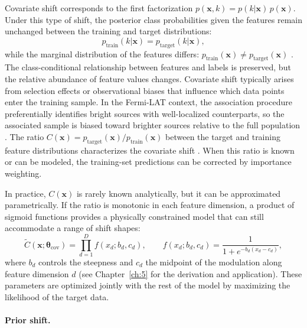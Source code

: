 Covariate shift corresponds to the first factorization $p(\mathbf{x}, k) = p(k|\mathbf{x})\,p(\mathbf{x})$.
Under this type of shift, the posterior class probabilities given the features remain unchanged between the training and target distributions:
\begin{equation}
	p_{\text{train}}(k|\mathbf{x}) = p_{\text{target}}(k|\mathbf{x}),
	\label{eq:covariate_shift}
\end{equation}
while the marginal distribution of the features differs: $p_{\text{train}}(\mathbf{x}) \neq p_{\text{target}}(\mathbf{x})$ \cite{MorenoTorres2012AUV}.
The class-conditional relationship between features and labels is preserved, but the relative abundance of feature values changes.
Covariate shift typically arises from selection effects or observational biases that influence which data points enter the training sample.
In the Fermi-LAT context, the association procedure preferentially identifies bright sources with well-localized counterparts, so the associated sample is biased toward brighter sources relative to the full population \cite{2023RASTI...2..735M}.
The ratio $C(\mathbf{x}) = p_{\text{target}}(\mathbf{x})/p_{\text{train}}(\mathbf{x})$ between the target and training feature distributions characterizes the covariate shift \cite{MorenoTorres2012AUV}.
When this ratio is known or can be modeled, the training-set predictions can be corrected by importance weighting.

In practice, $C(\mathbf{x})$ is rarely known analytically, but it can be approximated parametrically.
If the ratio is monotonic in each feature dimension, a product of sigmoid functions provides a physically constrained model that can still accommodate a range of shift shapes:
\begin{equation}
	\tilde{C}(\mathbf{x};\boldsymbol{\theta}_{\text{cov}}) = \prod_{d=1}^{D} f(x_d; b_d, c_d), \qquad f(x_d; b_d, c_d) = \frac{1}{1 + e^{-b_d(x_d - c_d)}},
	\label{eq:sigmoid_modulation}
\end{equation}
where $b_d$ controls the steepness and $c_d$ the midpoint of the modulation along feature dimension $d$ (see Chapter~\ref{ch:5} for the derivation and application).
These parameters are optimized jointly with the rest of the model by maximizing the likelihood of the target data.

\paragraph{Prior shift.}

